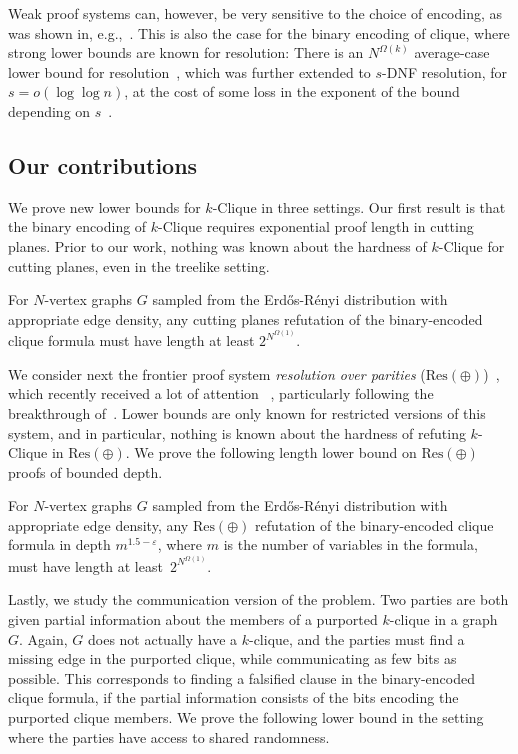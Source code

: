 \documentclass[10pt,a4paper]{article}
\theoremstyle{definition}
\theoremstyle{remark}
\theoremstyle{example}
\theoremstyle{plain}
\newcommand{\ResParity}{\mathrm{Res}(\oplus)}
\newcommand{\ResLin}{\textrm{Res}(\oplus)}
\newcommand{\graphSize}{N}
\newcommand{\kClique}{$k$-\textsf{Clique}\xspace}
\providecommand{\erdosrenyi}{Erd\H{o}s-R\'{e}nyi\xspace}
\begin{document}
Weak proof systems can, however, be very sensitive to the choice of encoding, as was shown in, e.g.,~\cite{DGGM24Binary}.
This is also the case for the binary encoding of clique, where strong lower bounds are known for resolution:
There is an $\graphSize^{\Omega(k)}$ average-case lower bound for resolution~\cite{LPRT17ComplexityRamsey}, which was further extended to $s$-DNF resolution, for $s=o(\log \log n)$, at the cost of some loss in the exponent of the bound depending on $s$~\cite{DGGM24Binary}.


\subsection{Our contributions} 

We prove new lower bounds for $k$-\textsf{Clique} in three settings. Our first result is that
the binary encoding of $k$-\textsf{Clique} requires exponential proof length in cutting planes.
Prior to our work, nothing was known about the hardness of \kClique for cutting planes, even in the treelike setting.

\begin{theorem}[Informal]\label{thm:CP-informal}
    For $\graphSize$-vertex graphs $G$ sampled from the \erdosrenyi distribution with appropriate edge density, any cutting planes refutation of the binary-encoded clique formula must have length at least $2^{\graphSize^{\Omega(1)}}$.
\end{theorem}

We consider next the frontier proof system \emph{resolution over parities} ($\ResParity$)~\cite{IS20ResLin},
which recently received a lot of attention~
\cite{BhattacharyaCD24,AI25lifting,EI25amortized,BC25exponential,BI25bphp}, particularly following the breakthrough of~\cite{EGI24regular}.
Lower bounds are only known for restricted versions of this system, and in particular,
nothing is known about the hardness of refuting $k$-\textsf{Clique} in $\ResLin$.
We prove the following length lower bound on $\ResLin$ proofs of bounded depth.
\begin{theorem}[Informal]\label{thm:ResLin-informal}
    For $\graphSize$-vertex graphs $G$ sampled from the \erdosrenyi distribution with appropriate edge density,
    any $\ResLin$ refutation of the binary-encoded clique formula in depth $m^{1.5-\varepsilon}$, where $m$ is the number of variables in the formula, must have length at least~$2^{\graphSize^{\Omega(1)}}$.
\end{theorem}

Lastly, we study the communication version of the problem. 
Two parties are both given partial information about the members of a purported $k$-clique in a graph $G$.
Again, $G$ does not actually have a $k$-clique, and the parties must find a missing edge 
in
the purported clique, while communicating as few bits as possible.
This corresponds to finding a falsified clause in the binary-encoded clique formula, if the partial information consists of the bits encoding the purported clique members.
We prove the following lower bound
in the setting where the parties have access to shared randomness.
\end{document}
